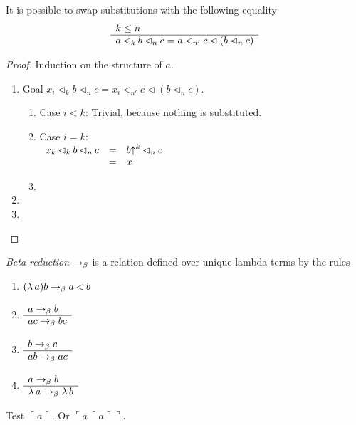 \begin{theorem}
  It is possible to swap substitutions with the following equality
  $$
  \begin{array}{l} k \le n \\ \hline a \lhd_k b \lhd_n c = a \lhd_{n'} c \lhd (b \lhd_n c)\end{array}
  $$
  \begin{proof} Induction on the structure of $a$.
    \begin{enumerate}
    \item
      Goal $x_i \lhd_k b \lhd_n c = x_i \lhd_{n'} c \lhd (b \lhd_n c)$.
      \begin{enumerate}
      \item Case $i < k$: Trivial, because nothing is substituted.
      \item Case $i = k$:\\
        $\begin{array}{lll}
            x_k \lhd_k b \lhd_n c &=& b{\uparrow}^k \lhd_n c \cr
            &=& x
          \end{array}
          $
      \item
      \end{enumerate}
    \item
    \item
    \end{enumerate}
  \end{proof}
\end{theorem}


\begin{definition} \emph{Beta reduction} $\to_\beta$ is a relation defined over
  unique lambda terms by the rules
  \begin{enumerate}
  \item $(\lambda\, a) b \to_\beta a \lhd b$
  \item $\begin{array}{l} a\to_\beta b \\ \hline a c \to_\beta b c\end{array}$
  \item $\begin{array}{l} b\to_\beta c \\ \hline a b \to_\beta a c\end{array}$
  \item $\begin{array}{l} a \to_\beta b \\ \hline \lambda\, a \to_\beta \lambda\, b\end{array}$
  \end{enumerate}
\end{definition}


Test $\ulcorner a \urcorner $. Or $\ulcorner a\, \ulcorner a \urcorner \urcorner $.